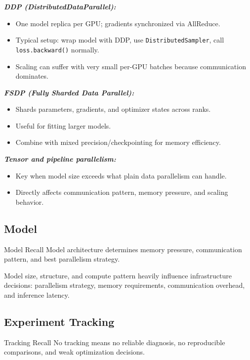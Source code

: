 \documentclass[12pt]{article}
\let\origtextbf\textbf
\renewcommand{\textbf}[1]{\origtextbf{\textit{#1}}}
\begin{document}
\textbf{DDP (DistributedDataParallel):}
\begin{itemize}
\item One model replica per GPU; gradients synchronized via AllReduce.
\item Typical setup: wrap model with DDP, use \texttt{DistributedSampler}, call \texttt{loss.backward()} normally.
\item Scaling can suffer with very small per-GPU batches because communication dominates.
\end{itemize}

\textbf{FSDP (Fully Sharded Data Parallel):}
\begin{itemize}
\item Shards parameters, gradients, and optimizer states across ranks.
\item Useful for fitting larger models.
\item Combine with mixed precision/checkpointing for memory efficiency.
\end{itemize}

\textbf{Tensor and pipeline parallelism:}
\begin{itemize}
\item Key when model size exceeds what plain data parallelism can handle.
\item Directly affects communication pattern, memory pressure, and scaling behavior.
\end{itemize}

\subsection{Model}
\begin{bluebox}{Model Recall}
Model architecture determines memory pressure, communication pattern, and best parallelism strategy.
\end{bluebox}

Model size, structure, and compute pattern heavily influence infrastructure decisions: parallelism strategy, memory requirements, communication overhead, and inference latency.

\subsection{Experiment Tracking}
\begin{bluebox}{Tracking Recall}
No tracking means no reliable diagnosis, no reproducible comparisons, and weak optimization decisions.
\end{bluebox}
\end{document}
